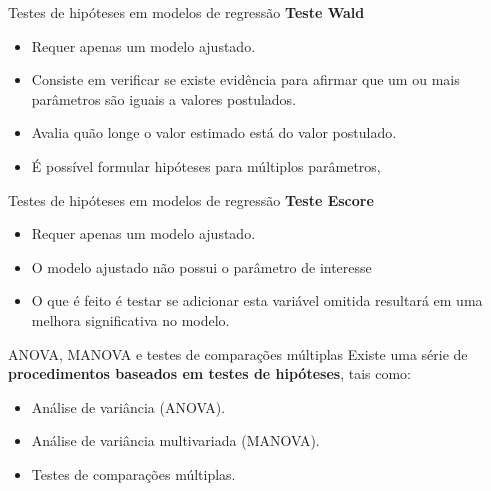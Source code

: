 \documentclass[
  ignorenonframetext,
  serif,
  professionalfont,
  usenames,
  dvipsnames,
  aspectratio = 169]{beamer}
\begin{document}
\begin{frame}{Testes de hipóteses em modelos de regressão}
\protect\hypertarget{testes-de-hipuxf3teses-em-modelos-de-regressuxe3o-2}{}
\textbf{Teste Wald}

\begin{itemize}

  \itemsep 2ex
  
  \item Requer apenas um modelo ajustado. 

  \item Consiste em verificar se existe evidência para afirmar que um ou mais parâmetros são iguais a valores postulados. 

  \item Avalia quão longe o valor estimado está do valor postulado. 

  \item É possível formular hipóteses para múltiplos parâmetros, 

\end{itemize}
\end{frame}

\begin{frame}{Testes de hipóteses em modelos de regressão}
\protect\hypertarget{testes-de-hipuxf3teses-em-modelos-de-regressuxe3o-3}{}
\textbf{Teste Escore}

\begin{itemize}

  \itemsep 2ex
  
  \item Requer apenas um modelo ajustado. 

  \item O modelo ajustado não possui o parâmetro de interesse

  \item O que é feito é testar se adicionar esta variável omitida resultará em uma melhora significativa no modelo. 

\end{itemize}
\end{frame}

\begin{frame}{ANOVA, MANOVA e testes de comparações múltiplas}
\protect\hypertarget{anova-manova-e-testes-de-comparauxe7uxf5es-muxfaltiplas}{}
Existe uma série de
\textbf{procedimentos baseados em testes de hipóteses}, tais como:

\begin{itemize}

  \itemsep 2ex
  
  \item Análise de variância (ANOVA).
  \item Análise de variância multivariada (MANOVA).
  \item Testes de comparações múltiplas.

\end{itemize}
\end{frame}
\end{document}
